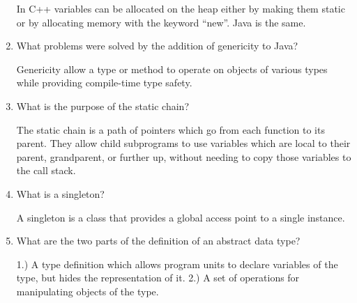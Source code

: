 \begin{enumerate}
 \begin{answer}

    In C++ variables can be allocated on the heap either by making them static
or by allocating memory with the keyword ``new''.  Java is the same.

    \end{answer}

  \item What problems were solved by the addition
    of genericity to Java?

 \begin{answer}

    Genericity allow a type or method to operate on objects of various types
while providing compile-time type safety.

    \end{answer}

  \item What is the purpose of the static chain?

 \begin{answer}

    The static chain is a path of pointers which go from each function to its
parent. They allow child subprograms to use variables which are local to their
parent, grandparent, or further up, without needing to copy those variables to the
call stack.

    \end{answer}

  \item What is a singleton?

 \begin{answer}

    A singleton is a class that provides a global access point to a single instance.

    \end{answer}

  \item What are the two parts of the definition 
    of an abstract data type?

 \begin{answer}

    1.) A type definition which allows program units to declare variables of the 
type, but hides the representation of it.
    2.) A set of operations for manipulating objects of the type.

    \end{answer}

  \end{enumerate}


